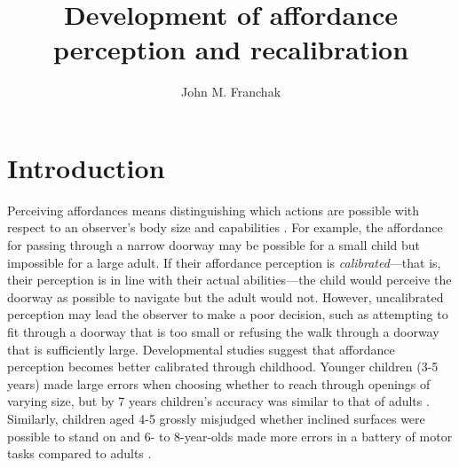 \documentclass[a4paper,man,natbib,floatsintext,noextraspace]{apa6}
\title{Development of affordance perception and recalibration}
\author{John M. Franchak}
\affiliation{University of California, Riverside}
\begin{document}
\maketitle

\section{Introduction}

Perceiving affordances means distinguishing which actions are possible with respect to an observer's body size and capabilities \citep{Gibson79}. For example, the affordance for passing through a narrow doorway may be possible for a small child but impossible for a large adult. If their affordance perception is \textit{calibrated}---that is, their perception is in line with their actual abilities---the child would perceive the doorway as possible to navigate but the adult would not. However, uncalibrated perception may lead the observer to make a poor decision, such as attempting to fit through a doorway that is too small or refusing the walk through a doorway that is sufficiently large. Developmental studies suggest that affordance perception becomes better calibrated through childhood. Younger children (3-5 years) made large errors when choosing whether to reach through openings of varying size, but by 7 years children’s accuracy was similar to that of adults \citep{ChildReaching}. Similarly, children aged 4-5 grossly misjudged whether inclined surfaces were possible to stand on \citep{KlevbergAnderson} and 6- to 8-year-olds made more errors in a battery of motor tasks compared to adults \citep{Plumert95}.  
\end{document}
